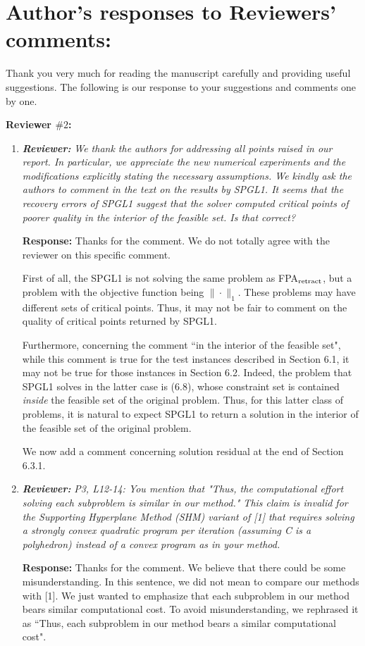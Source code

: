 \documentclass{article}
\begin{document}
\section*{Author's responses to Reviewers' comments:}
Thank you very much for reading the manuscript carefully and providing useful suggestions. The following is our response to your suggestions and comments one by one.

\textbf{Reviewer $\# 2$:}

\begin{enumerate}
	\item \textit{\textbf{Reviewer:}} \textit{ We thank the authors for addressing all points raised in our report. In particular, we appreciate the new numerical experiments and the modifications explicitly stating the necessary assumptions. We kindly ask the authors to comment in the text on the results by SPGL1. It seems that the recovery errors of SPGL1 suggest that the solver computed critical points of poorer quality in the interior of the feasible set. Is that correct?}
	
	\textbf{Response:} Thanks for the comment. We do not totally agree with the reviewer on this specific comment.

First of all, the SPGL1 is not solving the same problem as FPA$_{\rm retract}$, but a problem with the objective function being $\|\cdot\|_1$. These problems may have different sets of critical points. Thus, it may not be fair to comment on the quality of critical points returned by SPGL1.

Furthermore, concerning the comment ``in the interior of the feasible set", while this comment is true for the test instances described in Section 6.1, it may not be true for those instances in Section 6.2. Indeed, the problem that SPGL1 solves in the latter case is (6.8), whose constraint set is contained \emph{inside} the feasible set of the original problem. Thus, for this latter class of problems, it is natural to expect SPGL1 to return a solution in the interior of the feasible set of the original problem.

We now add a comment concerning solution residual at the end of Section 6.3.1.
	
    \item \textit{\textbf{Reviewer:}} \textit{P3, L12-14: You mention that "Thus, the computational effort solving each subproblem is similar in our method."
        This claim is invalid for the Supporting Hyperplane Method (SHM) variant of [1] that requires solving a strongly convex quadratic program per iteration (assuming C is a polyhedron) instead of a convex program as in your method.}
	
    \textbf{Response:} Thanks for the comment.  We believe that there could be some misunderstanding. In this sentence, we did not mean to compare our methods with [1]. We just wanted to emphasize that each subproblem in our method bears similar computational cost. To avoid misunderstanding, we rephrased it as ``Thus, each subproblem in our method bears a similar computational cost".
\end{enumerate}	
\end{document}
